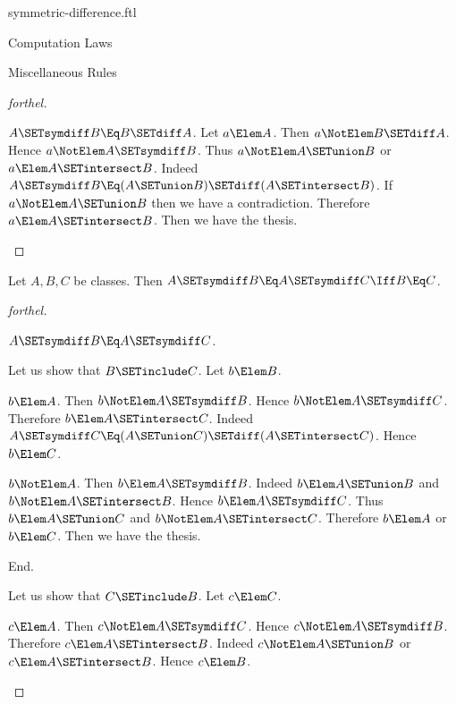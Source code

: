 \documentclass{stex}
\begin{document}
\begin{smodule}{symmetric-difference.ftl}
\begin{sfragment}{Computation Laws}
\begin{sfragment}{Miscellaneous Rules}
\begin{proof}[forthel]
      \begin{case}{$A \SETsymdiff B \Eq B \SETdiff A$.}
        Let $a \Elem A$.
        Then $a \NotElem B \SETdiff A$.
        Hence $a \NotElem A \SETsymdiff B$.
        Thus $a \NotElem A \SETunion B$ or $a \Elem A \SETintersect B$.
        Indeed $A \SETsymdiff B \Eq (A \SETunion B) \SETdiff (A \SETintersect B)$.
        If $a \NotElem A \SETunion B$ then we have a contradiction.
        Therefore $a \Elem A \SETintersect B$.
        Then we have the thesis.
      \end{case}
    \end{proof}

    \begin{proposition}[forthel,id=FOUNDATIONS_03_4490230937681920]
      Let $A, B, C$ be classes.
      Then $A \SETsymdiff B \Eq A \SETsymdiff C \Iff B \Eq C$.
    \end{proposition}
    \begin{proof}[forthel]
      \begin{case}{$A \SETsymdiff B \Eq A \SETsymdiff C$.}

        Let us show that $B \SETinclude C$.
          Let $b \Elem B$.

          \begin{case}{$b \Elem A$.}
            Then $b \NotElem A \SETsymdiff B$.
            Hence $b \NotElem A \SETsymdiff C$.
            Therefore $b \Elem A \SETintersect C$.
            Indeed $A \SETsymdiff C \Eq (A \SETunion C) \SETdiff (A \SETintersect C)$.
            Hence $b \Elem C$.
          \end{case}

          \begin{case}{$b \NotElem A$.}
            Then $b \Elem A \SETsymdiff B$.
            Indeed $b \Elem A \SETunion B$ and $b \NotElem A \SETintersect B$.
            Hence $b \Elem A \SETsymdiff C$.
            Thus $b \Elem A \SETunion C$ and $b \NotElem A \SETintersect C$.
            Therefore $b \Elem A$ or $b \Elem C$.
            Then we have the thesis.
          \end{case}
        End.

        Let us show that $C \SETinclude B$.
          Let $c \Elem C$.

          \begin{case}{$c \Elem A$.}
            Then $c \NotElem A \SETsymdiff C$.
            Hence $c \NotElem A \SETsymdiff B$.
            Therefore $c \Elem A \SETintersect B$.
            Indeed $c \NotElem A \SETunion B$ or $c \Elem A \SETintersect B$.
            Hence $c \Elem B$.
          \end{case}


\end{case}
\end{proof}
\end{sfragment}
\end{sfragment}
\end{smodule}
\end{document}
